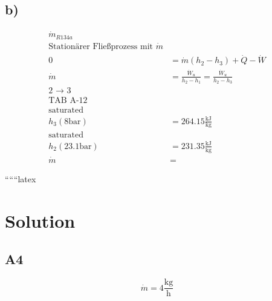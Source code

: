 

\subsection*{b)}

\begin{align*}
    \dot{m}_{R134a} \\
    \text{Stationärer Fließprozess mit } \dot{m} \\
    0 &= \dot{m}(h_2 - h_3) + \dot{Q} - \dot{W} \\
    \dot{m} &= \frac{\dot{W}_u}{h_2 - h_1} = \frac{\dot{W}_u}{h_2 - h_3} \\
    \text{2 $\to$ 3} \\
    \text{TAB A-12} \\
    \text{saturated} \\
    h_3 (8 \text{bar}) &= 264.15 \frac{\text{kJ}}{\text{kg}} \\
    \text{saturated} \\
    h_2 (23.1 \text{bar}) &= 231.35 \frac{\text{kJ}}{\text{kg}} \\
    \dot{m} &= 
\end{align*}

``````latex

\section*{Solution}

\subsection*{A4}
\[
\dot{m} = 4 \frac{\text{kg}}{\text{h}}
\]